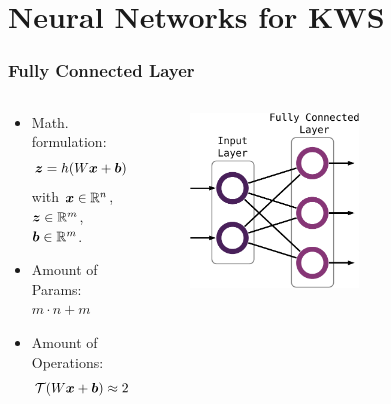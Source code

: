 
\section{Neural Networks for KWS}

\begin{frame}
  \frametitle{Fully Connected Layer}
  \vspace{-0.75cm}
  \begin{columns}
    \begin{column}{0.5\textwidth}
      \begin{itemize}
        \small
        \item Math. formulation:
        \begin{equation*}
          \footnotesize
          \bm{z} = h(W \bm{x} + \bm{b})
        \end{equation*}
        \footnotesize
        with $\bm{x} \in \mathbb{R}^n$, $\bm{z} \in \mathbb{R}^m$, $\bm{b} \in \mathbb{R}^m$.
        \small
        \vspace{0.2cm}
        \item Amount of Params: 
        \footnotesize 
        $m \cdot n + m$
        \small
        \vspace{0.2cm}
        \item Amount of Operations:
        \begin{equation*}
          \footnotesize
          \mathcal{T}(W \bm{x} + \bm{b}) \approx 2 (m \cdot n) + m
        \end{equation*}     
      \end{itemize}
    \end{column}
    \begin{column}{0.5\textwidth}
      \vspace{0.75cm}
      \centering
      \begin{figure} \includegraphics[width=0.6\textwidth]{../4_nn/figs/nn_theory_fc.pdf} \end{figure}
      \vfill
    \end{column}
  \end{columns}
\end{frame}


